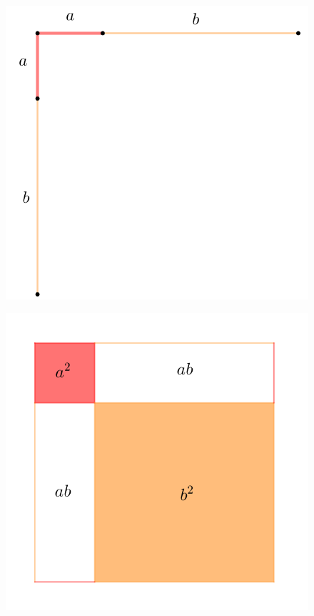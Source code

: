 \begin{figure}[H]
	\centering
	
	\includegraphics[scale=3.5]{imagens/soma-quadrado2.png}

\end{figure}
	
\begin{figure}[H]
	\centering
	
	\includegraphics[scale=3.5]{imagens/soma-quadrado.png}

\end{figure}
	
